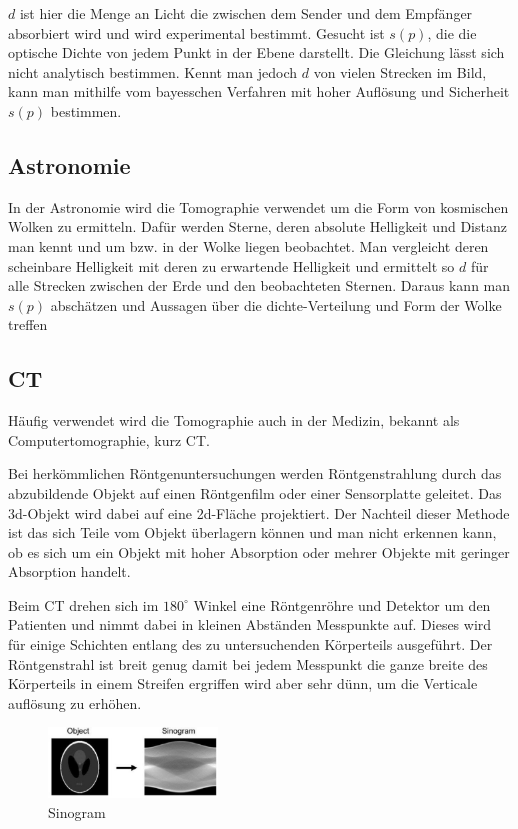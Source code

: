 \documentclass[]{dsadokumentation}
\begin{document}
$d$ ist hier die Menge an Licht die zwischen dem Sender und dem Empfänger absorbiert wird und wird experimental bestimmt. Gesucht ist $s(p)$, die die optische Dichte von jedem Punkt in der Ebene darstellt. Die Gleichung lässt sich nicht analytisch bestimmen. Kennt man jedoch $d$ von vielen Strecken im Bild, kann man mithilfe vom bayesschen Verfahren mit hoher Auflösung und Sicherheit $s(p)$ bestimmen.

\subsection{Astronomie}

In der Astronomie wird die Tomographie verwendet um die Form von kosmischen Wolken zu ermitteln. Dafür werden Sterne, deren absolute Helligkeit und Distanz man kennt und um bzw. in der Wolke liegen beobachtet. Man vergleicht deren scheinbare Helligkeit mit deren zu erwartende Helligkeit und ermittelt so $d$ für alle Strecken zwischen der Erde und den beobachteten Sternen. Daraus kann man $s(p)$ abschätzen und Aussagen über die dichte-Verteilung und Form der Wolke treffen

\subsection{CT}

Häufig verwendet wird die Tomographie auch in der Medizin, bekannt als Computertomographie, kurz CT.

Bei herkömmlichen Röntgenuntersuchungen werden Röntgenstrahlung durch das abzubildende Objekt auf einen Röntgenfilm oder einer Sensorplatte geleitet. Das 3d-Objekt wird dabei auf eine 2d-Fläche projektiert. Der Nachteil dieser Methode ist das sich Teile vom Objekt überlagern können und man nicht erkennen kann, ob es sich um ein Objekt mit hoher Absorption oder mehrer Objekte mit geringer Absorption handelt.

Beim CT drehen sich im $180^\circ$ Winkel eine Röntgenröhre und Detektor um den Patienten und nimmt dabei in kleinen Abständen Messpunkte auf. Dieses wird für einige Schichten entlang des zu untersuchenden Körperteils ausgeführt. Der Röntgenstrahl ist breit genug damit bei jedem Messpunkt die ganze breite des Körperteils in einem Streifen ergriffen wird aber sehr dünn, um die Verticale auflösung zu erhöhen.

\begin{figure}
\includegraphics[width=0.4\textwidth]{k4.2/backprojektion.png}
\caption{Sinogram}
\end{figure}
\end{document}
